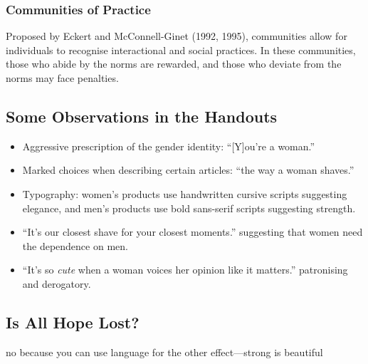 \documentclass[../main.tex]{subfiles}
\begin{document}
            \subsubsection{Communities of Practice}
            Proposed by Eckert and McConnell-Ginet (1992, 1995), communities allow for individuals to recognise interactional and social practices. In these communities, those who abide by the norms are rewarded, and those who deviate from the norms may face penalties. 

        \subsection{Some Observations in the Handouts}
        \begin{itemize}
            \item Aggressive prescription of the gender identity: ``[Y]ou're a woman.''
            \item Marked choices when describing certain articles: ``the way a woman shaves.''
            \item Typography: women's products use handwritten cursive scripts suggesting elegance, and men's products use bold sans-serif scripts suggesting strength.
            \item ``It's our closest shave for your closest moments.'' suggesting that women need the dependence on men.
            \item ``It's so \textit{cute} when a woman voices her opinion like it matters.'' patronising and derogatory.
        \end{itemize}

        \subsection{Is All Hope Lost?}
        no because you can use language for the other effect---strong is beautiful
\end{document}
